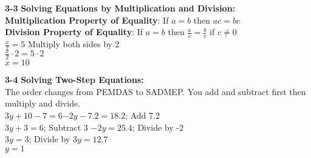 \begin{enumerate*}
		\item[\Large\textbf{3-3}] \Large\textbf{Solving Equations by Multiplication and Division:}\\
			\textbf{Multiplication Property of Equality}: If $a=b$ then $ac=bc$\\
			\textbf{Division Property of Equality}: If $a=b$ then $\frac{a}{c}=\frac{b}{c}$ if $c\neq0$\\
			$\frac{x}{2}=5$ Multiply both sides by 2\\$\frac{x}{2}\cdot2=5\cdot2$\\$x=10$\\
			
		\item[\Large\textbf{3-4}] \Large\textbf{Solving Two-Step Equations:}\\
			The order changes from PEMDAS to SADMEP. You add and subtract first then multiply and divide.\\
			$3y+10-7=6$\hfill$-2y-7.2=18.2$; Add 7.2 \\
			$3y+3=6$; Subtract 3 \hfill$-2y=25.4$; Divide by -2\\
			$3y=3$; Divide by 3\hfill$y=12.7$\\$y=1$\\
			

\end{enumerate*}
